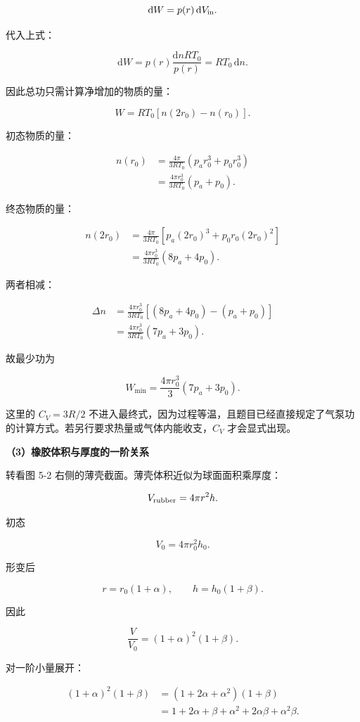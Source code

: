 \documentclass[12pt,a4paper,UTF8]{ctexart}
\begin{document}
\[\mathrm{d}W=p(r)\,\mathrm{d}V_{\rm in}.\]

代入上式：

\[\mathrm{d}W=p(r)\frac{\mathrm{d}nRT_0}{p(r)}=RT_0\,\mathrm{d}n.\]

因此总功只需计算净增加的物质的量：

\[W=RT_0[n(2r_0)-n(r_0)].\]

初态物质的量：

\[\begin{aligned}
n(r_0)
&=\frac{4\pi}{3RT_0}\left(p_ar_0^3+p_0r_0^3\right)\\
&=\frac{4\pi r_0^3}{3RT_0}(p_a+p_0).
\end{aligned}\]

终态物质的量：

\[\begin{aligned}
n(2r_0)
&=\frac{4\pi}{3RT_0}\left[p_a(2r_0)^3+p_0r_0(2r_0)^2\right]\\
&=\frac{4\pi r_0^3}{3RT_0}(8p_a+4p_0).
\end{aligned}\]

两者相减：

\[\begin{aligned}
\Delta n
&=\frac{4\pi r_0^3}{3RT_0}\left[(8p_a+4p_0)-(p_a+p_0)\right]\\
&=\frac{4\pi r_0^3}{3RT_0}(7p_a+3p_0).
\end{aligned}\]

故最少功为

\[\boxed{
W_{\min}=\frac{4\pi r_0^3}{3}(7p_a+3p_0)
}.\]

这里的 \(C_V=3R/2\)
不进入最终式，因为过程等温，且题目已经直接规定了气泵功的计算方式。若另行要求热量或气体内能收支，\(C_V\)
才会显式出现。

\textbf{（3）橡胶体积与厚度的一阶关系}

转看图 5-2 右侧的薄壳截面。薄壳体积近似为球面面积乘厚度：

\[V_{\rm rubber}=4\pi r^2h.\]

初态

\[V_0=4\pi r_0^2h_0.\]

形变后

\[r=r_0(1+\alpha),\qquad h=h_0(1+\beta).\]

因此

\[\frac{V}{V_0}=(1+\alpha)^2(1+\beta).\]

对一阶小量展开：

\[\begin{aligned}
(1+\alpha)^2(1+\beta)
&=(1+2\alpha+\alpha^2)(1+\beta)\\
&=1+2\alpha+\beta+\alpha^2+2\alpha\beta+\alpha^2\beta.
\end{aligned}\]
\end{document}
